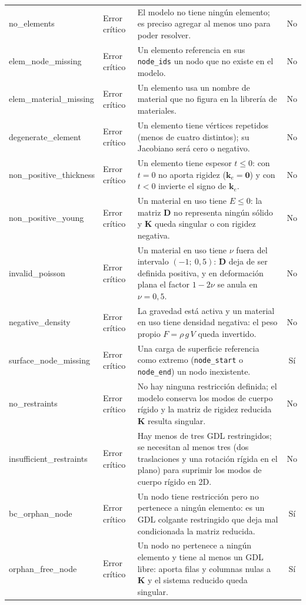 \begin{longtable}{@{}>{\ttfamily\footnotesize}p{2.8cm} >{\footnotesize}l >{\footnotesize\raggedright\arraybackslash}p{5.4cm} >{\footnotesize}c@{}}
no\_elements & Error crítico & El modelo no tiene ningún elemento; es preciso agregar al menos uno para poder resolver. & No \\
\addlinespace
elem\_node\_missing & Error crítico & Un elemento referencia en sus \texttt{node\_ids} un nodo que no existe en el modelo. & No \\
\addlinespace
elem\_material\_missing & Error crítico & Un elemento usa un nombre de material que no figura en la librería de materiales. & No \\
\addlinespace
degenerate\_element & Error crítico & Un elemento tiene vértices repetidos (menos de cuatro distintos); su Jacobiano será cero o negativo. & No \\
\addlinespace
non\_positive\_thickness & Error crítico & Un elemento tiene espesor $t \le 0$: con $t = 0$ no aporta rigidez ($\bm{k}_e = \bm{0}$) y con $t < 0$ invierte el signo de $\bm{k}_e$. & No \\
\addlinespace
non\_positive\_young & Error crítico & Un material en uso tiene $E \le 0$: la matriz $\bm{D}$ no representa ningún sólido y $\bm{K}$ queda singular o con rigidez negativa. & No \\
\addlinespace
invalid\_poisson & Error crítico & Un material en uso tiene $\nu$ fuera del intervalo $(-1;\ 0{,}5)$: $\bm{D}$ deja de ser definida positiva, y en deformación plana el factor $1-2\nu$ se anula en $\nu = 0{,}5$. & No \\
\addlinespace
negative\_density & Error crítico & La gravedad está activa y un material en uso tiene densidad negativa: el peso propio $F = \rho\, g\, V$ queda invertido. & No \\
\addlinespace
surface\_node\_missing & Error crítico & Una carga de superficie referencia como extremo (\texttt{node\_start} o \texttt{node\_end}) un nodo inexistente. & Sí \\
\addlinespace
no\_restraints & Error crítico & No hay ninguna restricción definida; el modelo conserva los modos de cuerpo rígido y la matriz de rigidez reducida $\bm{K}$ resulta singular. & No \\
\addlinespace
insufficient\_restraints & Error crítico & Hay menos de tres GDL restringidos; se necesitan al menos tres (dos traslaciones y una rotación rígida en el plano) para suprimir los modos de cuerpo rígido en 2D. & No \\
\addlinespace
bc\_orphan\_node & Error crítico & Un nodo tiene restricción pero no pertenece a ningún elemento: es un GDL colgante restringido que deja mal condicionada la matriz reducida. & Sí \\
\addlinespace
orphan\_free\_node & Error crítico & Un nodo no pertenece a ningún elemento y tiene al menos un GDL libre: aporta filas y columnas nulas a $\bm{K}$ y el sistema reducido queda singular. & Sí \\
\midrule


\end{longtable}
